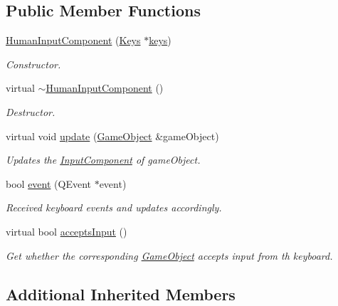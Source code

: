\subsection*{Public Member Functions}
\begin{DoxyCompactItemize}
\item 
\hyperlink{classHumanInputComponent_af8c2bd301c382eb5f353089010b20519}{Human\-Input\-Component} (\hyperlink{classKeys}{Keys} $\ast$\hyperlink{classInputComponent_ab4ab656db9378e27c34ff39d1e790308}{keys})
\begin{DoxyCompactList}\small\item\em Constructor. \end{DoxyCompactList}\item 
\hypertarget{classHumanInputComponent_acb45d35e71bd98d382d3684a88aaf42e}{virtual \hyperlink{classHumanInputComponent_acb45d35e71bd98d382d3684a88aaf42e}{$\sim$\-Human\-Input\-Component} ()}\label{classHumanInputComponent_acb45d35e71bd98d382d3684a88aaf42e}

\begin{DoxyCompactList}\small\item\em Destructor. \end{DoxyCompactList}\item 
virtual void \hyperlink{classHumanInputComponent_a10e31c29b86c3c6fff99e699dca28e82}{update} (\hyperlink{classGameObject}{Game\-Object} \&game\-Object)
\begin{DoxyCompactList}\small\item\em Updates the \hyperlink{classInputComponent}{Input\-Component} of game\-Object. \end{DoxyCompactList}\item 
bool \hyperlink{classHumanInputComponent_ac06da10a796d7975c1a97c2618e8fcfd}{event} (Q\-Event $\ast$event)
\begin{DoxyCompactList}\small\item\em Received keyboard events and updates accordingly. \end{DoxyCompactList}\item 
virtual bool \hyperlink{classHumanInputComponent_ac6701b0da2dea7c3764d9159625f269f}{accepts\-Input} ()
\begin{DoxyCompactList}\small\item\em Get whether the corresponding \hyperlink{classGameObject}{Game\-Object} accepts input from th keyboard. \end{DoxyCompactList}\end{DoxyCompactItemize}
\subsection*{Additional Inherited Members}


